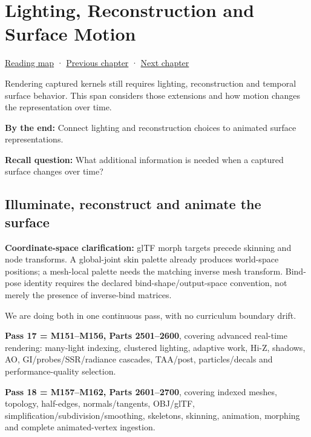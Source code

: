 \hypertarget{04-visual-computing-ii-ch040}{}
\chapter{Lighting, Reconstruction and Surface Motion}\label{04-visual-computing-ii-ch040-lighting-reconstruction-and-surface-motion}

\hyperref[volume-reading-map]{Reading map} · \hyperref[04-visual-computing-ii-ch039-tiling-ordering-and-compositing-at-scale]{Previous chapter} · \hyperref[04-visual-computing-ii-ch041-per-vertex-and-per-corner-mesh-attributes]{Next chapter}

Rendering captured kernels still requires lighting, reconstruction and temporal surface behavior. This span considers those extensions and how motion changes the representation over time.

\textbf{By the end:} Connect lighting and reconstruction choices to animated surface representations.

\textbf{Recall question:} What additional information is needed when a captured surface changes over time?

\section{Illuminate, reconstruct and animate the surface}\label{04-visual-computing-ii-ch040-illuminate-reconstruct-and-animate-the-surface}

\textbf{Coordinate-space clarification:} glTF morph targets precede skinning and node transforms. A global-joint skin palette already produces world-space positions; a mesh-local palette needs the matching inverse mesh transform. Bind-pose identity requires the declared bind-shape/output-space convention, not merely the presence of inverse-bind matrices.

We are doing both in one continuous pass, with no curriculum boundary drift.

\textbf{Pass 17 = M151--M156, Parts 2501--2600}, covering advanced real-time rendering: many-light indexing, clustered lighting, adaptive work, Hi-Z, shadows, AO, GI/probes/SSR/radiance cascades, TAA/post, particles/decals and performance-quality selection.

\textbf{Pass 18 = M157--M162, Parts 2601--2700}, covering indexed meshes, topology, half-edges, normals/tangents, OBJ/glTF, simplification/subdivision/smoothing, skeletons, skinning, animation, morphing and complete animated-vertex ingestion.

